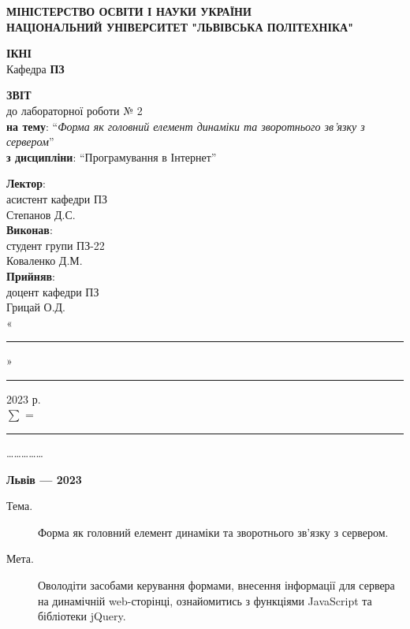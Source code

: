 \documentclass{article}
\newcommand\subject{Програмування в Інтернет}
\newcommand\lecturer{асистент кафедри ПЗ \\ Степанов Д.С.}
\newcommand\teacher{доцент кафедри ПЗ \\ Грицай О.Д.}
\newcommand\mygroup{ПЗ-22}
\newcommand\lab{2}
\newcommand\theme{Форма як головний елемент динаміки та зворотнього зв’язку з сервером}
\newcommand\purpose{Оволодіти засобами керування формами, внесення інформації для сервера на
	динамічній web-сторінці, ознайомитись з функціями JavaScript та бібліотеки jQuery}
\begin{document}
\begin{normalsize}
\begin{titlepage}
	\thispagestyle{empty}
	\begin{center}
		\textbf{МІНІСТЕРСТВО ОСВІТИ І НАУКИ УКРАЇНИ\\
			НАЦІОНАЛЬНИЙ УНІВЕРСИТЕТ "ЛЬВІВСЬКА ПОЛІТЕХНІКА"}
	\end{center}
	\begin{flushright}
		\textbf{ІКНІ}\\
		Кафедра \textbf{ПЗ}
	\end{flushright}
	\vspace{200pt}
	\begin{center}
		\textbf{ЗВІТ}\\
		\vspace{10pt}
		до лабораторної роботи № \lab\\
		\textbf{на тему}: “\textit{\theme}”\\
		\textbf{з дисципліни}: “\subject”
	\end{center}
	\vspace{112pt}
	\begin{flushright}
		
		\textbf{Лектор}:\\
		\lecturer\\
		\vspace{28pt}
		\textbf{Виконав}:\\
		
		студент групи \mygroup\\
		Коваленко Д.М.\\
		\vspace{28pt}
		\textbf{Прийняв}:\\
		
		\teacher\\
		
		\vspace{28pt}
		«\rule{1cm}{0.15mm}» \rule{1.5cm}{0.15mm} 2023 р.\\
		$\sum$ = \rule{1cm}{0.15mm}……………\\
		
	\end{flushright}
	\vspace{\fill}
	\begin{center}
		\textbf{Львів — 2023}
	\end{center}
\end{titlepage}
	
\begin{description}
	\item[Тема.] \theme.
	\item[Мета.] \purpose.
\end{description}


\end{normalsize}
\end{document}
